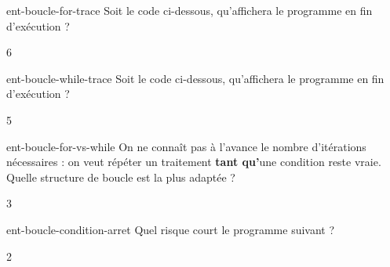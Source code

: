 
\begin{question}{ent-boucle-for-trace}
    Soit le code ci-dessous, qu'affichera le programme en fin d'exécution ?
    
    \begin{multicols}{6}
        \begin{reponses}
        \end{reponses}
    \end{multicols}
\end{question}

\begin{question}{ent-boucle-while-trace}
    Soit le code ci-dessous, qu'affichera le programme en fin d'exécution ?
    
    \begin{multicols}{5}
        \begin{reponses}
        \end{reponses}
    \end{multicols}
\end{question}

\begin{question}{ent-boucle-for-vs-while}
    On ne connaît pas à l'avance le nombre d'itérations nécessaires : on veut répéter un traitement \textbf{tant qu'}une condition reste vraie. Quelle structure de boucle est la plus adaptée ?
    \begin{multicols}{3}
        \begin{reponses}
        \end{reponses}
    \end{multicols}
\end{question}

\begin{question}{ent-boucle-condition-arret}
    Quel risque court le programme suivant ?
    
    \begin{multicols}{2}
        \begin{reponses}
        \end{reponses}
    \end{multicols}
\end{question}

